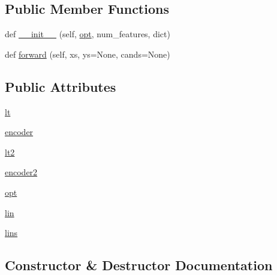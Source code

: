 \subsection*{Public Member Functions}
\begin{DoxyCompactItemize}
\item 
def \hyperlink{classparlai_1_1agents_1_1starspace_1_1modules_1_1Starspace_a28383f59fc45a0fa2193787aa2a8b188}{\+\_\+\+\_\+init\+\_\+\+\_\+} (self, \hyperlink{classparlai_1_1agents_1_1starspace_1_1modules_1_1Starspace_af1f3c22c7248018379df0379d253f8db}{opt}, num\+\_\+features, dict)
\item 
def \hyperlink{classparlai_1_1agents_1_1starspace_1_1modules_1_1Starspace_a08e4e81ef10c1ec4c09ab6c8147690ab}{forward} (self, xs, ys=None, cands=None)
\end{DoxyCompactItemize}
\subsection*{Public Attributes}
\begin{DoxyCompactItemize}
\item 
\hyperlink{classparlai_1_1agents_1_1starspace_1_1modules_1_1Starspace_abec90fc1b96357cb230a2b3118c9275f}{lt}
\item 
\hyperlink{classparlai_1_1agents_1_1starspace_1_1modules_1_1Starspace_aa93228651180a1901e55585fe9008002}{encoder}
\item 
\hyperlink{classparlai_1_1agents_1_1starspace_1_1modules_1_1Starspace_ae5bf28970ad7bd4207e8fe69986986fc}{lt2}
\item 
\hyperlink{classparlai_1_1agents_1_1starspace_1_1modules_1_1Starspace_a7ead99b8e725174d82e97bd014bd26c9}{encoder2}
\item 
\hyperlink{classparlai_1_1agents_1_1starspace_1_1modules_1_1Starspace_af1f3c22c7248018379df0379d253f8db}{opt}
\item 
\hyperlink{classparlai_1_1agents_1_1starspace_1_1modules_1_1Starspace_ab8e5d5eaf9aba2d98fdcf56dd5bf986d}{lin}
\item 
\hyperlink{classparlai_1_1agents_1_1starspace_1_1modules_1_1Starspace_a277328d66e566f3f9874e7af4402cef9}{lins}
\end{DoxyCompactItemize}


\subsection{Constructor \& Destructor Documentation}
\mbox{\label{classparlai_1_1agents_1_1starspace_1_1modules_1_1Starspace_a28383f59fc45a0fa2193787aa2a8b188}} 
